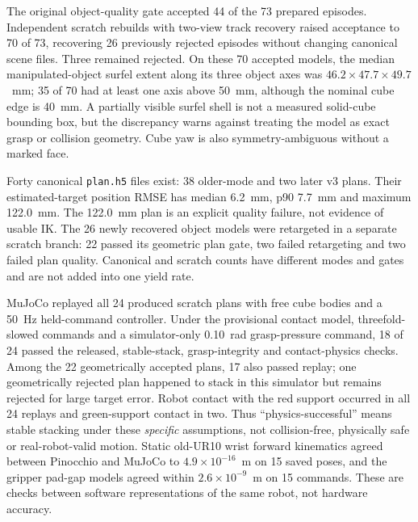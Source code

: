 The original object-quality gate accepted 44 of the 73 prepared episodes.
Independent scratch rebuilds with two-view track recovery raised acceptance
to 70 of 73, recovering 26 previously rejected episodes without changing
canonical scene files. Three remained rejected. On these 70 accepted models,
the median manipulated-object surfel extent along its three object axes was
$46.2\times47.7\times49.7$~mm; 35 of 70 had at least one axis above 50~mm,
although the nominal cube edge is 40~mm. A partially visible surfel shell is
not a measured solid-cube bounding box, but the discrepancy warns against
treating the model as exact grasp or collision geometry. Cube yaw is also
symmetry-ambiguous without a marked face.

Forty canonical \texttt{plan.h5} files exist: 38 older-mode and two later v3
plans. Their estimated-target position RMSE has median 6.2~mm, p90 7.7~mm
and maximum 122.0~mm. The 122.0~mm plan is an explicit quality failure,
not evidence of usable IK. The 26 newly recovered object models were
retargeted in a separate scratch branch: 22 passed its geometric plan gate,
two failed retargeting and two failed plan quality. Canonical and scratch
counts have different modes and gates and are not added into one yield rate.

MuJoCo replayed all 24 produced scratch plans with free cube bodies and a
50~Hz held-command controller. Under the provisional contact model,
threefold-slowed commands and a simulator-only 0.10~rad grasp-pressure
command, 18 of 24 passed the released, stable-stack, grasp-integrity and
contact-physics checks. Among the 22 geometrically accepted plans, 17 also
passed replay; one geometrically rejected plan happened to stack in this
simulator but remains rejected for large target error. Robot contact with
the red support occurred in all 24 replays and green-support contact in two.
Thus ``physics-successful'' means stable stacking under these \emph{specific}
assumptions, not collision-free, physically safe or real-robot-valid motion.
Static old-UR10 wrist forward kinematics agreed between Pinocchio and
MuJoCo to $4.9\times10^{-16}$~m on 15 saved poses, and the gripper pad-gap
models agreed within $2.6\times10^{-9}$~m on 15 commands. These are checks
between software representations of the same robot, not hardware accuracy.

